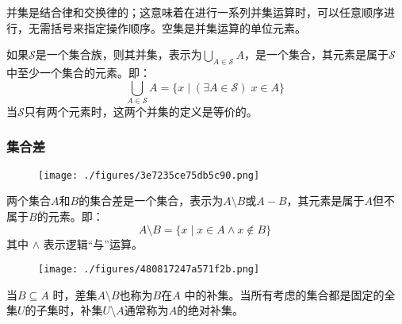 并集是结合律和交换律的；这意味着在进行一系列并集运算时，可以任意顺序进行，无需括号来指定操作顺序。空集是并集运算的单位元素。

如果\( \mathcal{S} \)是一个集合族，则其并集，表示为\( \bigcup_{A \in \mathcal{S}} A \)，是一个集合，其元素是属于\( \mathcal{S} \)中至少一个集合的元素。即：
\[
\bigcup_{A \in \mathcal{S}} A = \{x \mid (\exists A \in \mathcal{S})\; x \in A\}~
\]
当\( \mathcal{S} \)只有两个元素时，这两个并集的定义是等价的。
\subsubsection{集合差}
\begin{figure}[ht]
\centering
\texttt{[image: ./figures/3e7235ce75db5c90.png]}
\caption{} \label{fig_JHSX_6}
\end{figure}
两个集合\( A \)和\( B \)的集合差是一个集合，表示为\( A \setminus B \)或\( A - B \)，其元素是属于\( A \)但不属于\( B \)的元素。即：
\[
A \setminus B = \{x \mid x \in A \land x \notin B\}~
\]
其中 \( \land \) 表示逻辑“与”运算。
\begin{figure}[ht]
\centering
\texttt{[image: ./figures/480817247a571f2b.png]}
\caption{} \label{fig_JHSX_7}
\end{figure}
当\( B \subseteq A \) 时，差集\( A \setminus B \)也称为\( B \)在\( A \) 中的补集。当所有考虑的集合都是固定的全集\( U \)的子集时，补集\( U \setminus A \)通常称为\( A \)的绝对补集。
